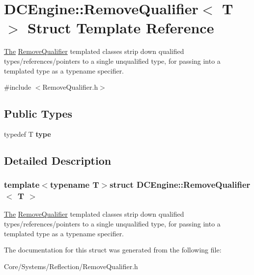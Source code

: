 \hypertarget{structDCEngine_1_1RemoveQualifier}{\section{D\-C\-Engine\-:\-:Remove\-Qualifier$<$ T $>$ Struct Template Reference}
\label{structDCEngine_1_1RemoveQualifier}
}


\hyperlink{classThe}{The} \hyperlink{structDCEngine_1_1RemoveQualifier}{Remove\-Qualifier} templated classes strip down qualified types/references/pointers to a single unqualified type, for passing into a templated type as a typename specifier.  




{\ttfamily \#include $<$Remove\-Qualifier.\-h$>$}

\subsection*{Public Types}
\begin{DoxyCompactItemize}
\item 
\hypertarget{structDCEngine_1_1RemoveQualifier_aa43b9e327b1ce047a0f71d65cb27993a}{typedef T {\bfseries type}}\label{structDCEngine_1_1RemoveQualifier_aa43b9e327b1ce047a0f71d65cb27993a}

\end{DoxyCompactItemize}


\subsection{Detailed Description}
\subsubsection*{template$<$typename T$>$struct D\-C\-Engine\-::\-Remove\-Qualifier$<$ T $>$}

\hyperlink{classThe}{The} \hyperlink{structDCEngine_1_1RemoveQualifier}{Remove\-Qualifier} templated classes strip down qualified types/references/pointers to a single unqualified type, for passing into a templated type as a typename specifier. 

The documentation for this struct was generated from the following file\-:\begin{DoxyCompactItemize}
\item 
Core/\-Systems/\-Reflection/Remove\-Qualifier.\-h\end{DoxyCompactItemize}
